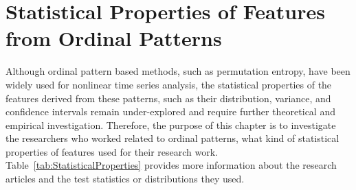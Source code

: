 \chapter{Statistical Properties of Features from Ordinal Patterns}\label{C:StatisitcalProperty}

Although ordinal pattern based methods, such as permutation entropy, have been widely used for nonlinear time series analysis, the statistical properties of the features derived from these patterns, such as their distribution, variance, and confidence intervals remain under-explored and require further theoretical and empirical investigation. Therefore, the purpose of this chapter is to investigate the researchers who worked related to ordinal patterns, what kind of statistical properties of features used for their research work. Table~\ref{tab:StatisticalProperties} provides more information about the research articles and the test statistics or distributions they used.



